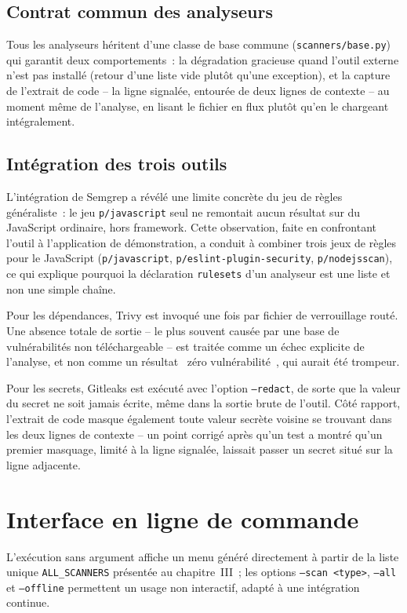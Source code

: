 \documentclass[12pt,a4paper,oneside]{report}
\begin{document}
\subsection{Contrat commun des analyseurs}
Tous les analyseurs h\'eritent d'une classe de base commune (\texttt{scanners/base.py}) qui garantit deux comportements~: la d\'egradation gracieuse quand l'outil externe n'est pas install\'e (retour d'une liste vide plut\^ot qu'une exception), et la capture de l'extrait de code -- la ligne signal\'ee, entour\'ee de deux lignes de contexte -- au moment m\^eme de l'analyse, en lisant le fichier en flux plut\^ot qu'en le chargeant int\'egralement.

\subsection{Int\'egration des trois outils}
L'int\'egration de Semgrep a r\'ev\'el\'e une limite concr\`ete du jeu de r\`egles g\'en\'eraliste~: le jeu \texttt{p/javascript} seul ne remontait aucun r\'esultat sur du JavaScript ordinaire, hors framework. Cette observation, faite en confrontant l'outil \`a l'application de d\'emonstration, a conduit \`a combiner trois jeux de r\`egles pour le JavaScript (\texttt{p/javascript}, \texttt{p/eslint-plugin-security}, \texttt{p/nodejsscan}), ce qui explique pourquoi la d\'eclaration \texttt{rulesets} d'un analyseur est une liste et non une simple cha\^ine.

Pour les d\'ependances, Trivy est invoqu\'e une fois par fichier de verrouillage rout\'e. Une absence totale de sortie -- le plus souvent caus\'ee par une base de vuln\'erabilit\'es non t\'el\'echargeable -- est trait\'ee comme un \'echec explicite de l'analyse, et non comme un r\'esultat \guillemotleft~z\'ero vuln\'erabilit\'e~\guillemotright, qui aurait \'et\'e trompeur.

Pour les secrets, Gitleaks est ex\'ecut\'e avec l'option \texttt{--redact}, de sorte que la valeur du secret ne soit jamais \'ecrite, m\^eme dans la sortie brute de l'outil. Côt\'e rapport, l'extrait de code masque \'egalement toute valeur secr\`ete voisine se trouvant dans les deux lignes de contexte -- un point corrig\'e apr\`es qu'un test a montr\'e qu'un premier masquage, limit\'e \`a la ligne signal\'ee, laissait passer un secret situ\'e sur la ligne adjacente.

\section{Interface en ligne de commande}
L'ex\'ecution sans argument affiche un menu g\'en\'er\'e directement \`a partir de la liste unique \texttt{ALL\_SCANNERS} pr\'esent\'ee au chapitre~III~; les options \texttt{--scan~<type>}, \texttt{--all} et \texttt{--offline} permettent un usage non interactif, adapt\'e \`a une int\'egration continue.
\end{document}
